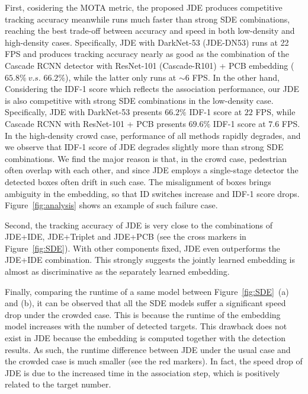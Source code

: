 \documentclass[runningheads]{llncs}
\def\vs{\textit{v.s. }}
\begin{document}
First, cosidering the MOTA metric, the proposed JDE produces competitive tracking accuracy meanwhile runs much faster than strong SDE combinations, reaching the best trade-off between accuracy and speed in both low-density and high-density cases. Specifically, JDE with DarkNet-53 (JDE-DN53) runs at 22 FPS and produces tracking accuracy nearly as good as the combination of the Cascade RCNN detector with ResNet-101 (Cascade-R101) + PCB embedding ($65.8\%~\vs 66.2\%$), while the latter only runs at $\sim$6 FPS. In the other hand, Considering the IDF-1 score which reflects the association performance, our JDE is also competitive with strong SDE combinations in the low-density case. Specifically, JDE with DarkNet-53 presents $66.2\%$ IDF-1 score at $22$ FPS, while Cascade RCNN with ResNet-101 + PCB presents $69.6\%$ IDF-1 score at $7.6$ FPS. In the high-density crowd case, performance of all methods rapidly degrades, and we observe that IDF-1 score of JDE degrades slightly more than strong SDE combinations. We find the major reason is that, in the crowd case, pedestrian often overlap with each other, and since JDE employs a single-stage detector the detected boxes often drift in such case. The misalignment of boxes brings ambiguity in the embedding, so that ID switches increase and IDF-1 score drops. Figure~\ref{fig:analysis} shows an example of such failure case.

Second, the tracking accuracy of JDE is very close to the combinations of JDE+IDE, JDE+Triplet and JDE+PCB  (see the cross markers in Figure~\ref{fig:SDE}). With other components fixed, JDE even outperforms the JDE+IDE combination. This strongly suggests the jointly learned embedding is almost as discriminative as the separately learned embedding. 

Finally, comparing the runtime of a same model between Figure~\ref{fig:SDE}~(a) and (b), it can be observed that all the SDE models suffer a significant speed drop under the crowded case. This is because the runtime of the embedding model increases with the number of detected targets. This drawback does not exist in JDE because the embedding is computed together with the detection results. As such, the runtime difference between JDE under the usual case and the crowded case is much smaller (see the red markers). In fact, the speed drop of JDE is due to the increased time in the association step, which is positively related to the target number.
\end{document}
